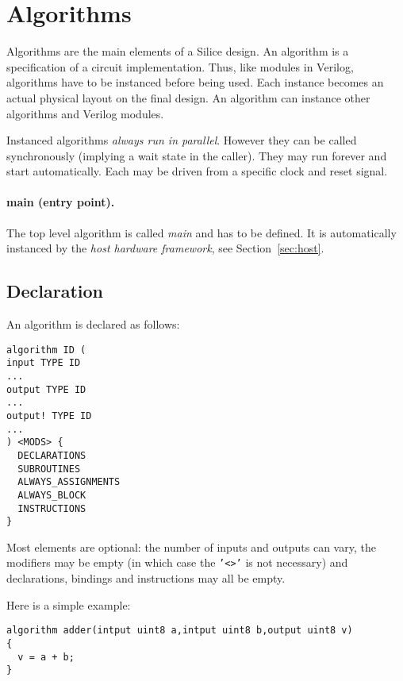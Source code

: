 \documentclass[a4]{article}
\newcommand\verilog{Verilog}
\newcommand\silice{Silice}
\begin{document}

\section{Algorithms}

Algorithms are the main elements of a \silice{} design. An algorithm is a specification of a circuit implementation. Thus, like modules in \verilog{}, algorithms have to be instanced before being used. Each instance becomes an actual physical layout on the final design.
An algorithm can instance other algorithms and \verilog{} modules. 

Instanced algorithms \textit{always run in parallel}. However they can be called synchronously (implying a wait state in the caller). They may run forever and start automatically. Each may be driven from a specific clock and reset signal.

\paragraph{main (entry point).}
The top level algorithm is called \textit{main} and has to be defined. It is automatically instanced by the \textit{host hardware framework}, see Section~\ref{sec:host}.


\subsection{Declaration}

An algorithm is declared as follows:
\begin{verbatim}
algorithm ID (
input TYPE ID
...
output TYPE ID
...
output! TYPE ID
...
) <MODS> {
  DECLARATIONS
  SUBROUTINES
  ALWAYS_ASSIGNMENTS
  ALWAYS_BLOCK
  INSTRUCTIONS
}
\end{verbatim}

Most elements are optional: the number of inputs and outputs can vary, the modifiers may be empty (in which case the \texttt{'<>'} is not necessary) and declarations, bindings and instructions may all be empty.

Here is a simple example:
\begin{verbatim}
algorithm adder(intput uint8 a,intput uint8 b,output uint8 v)
{
  v = a + b;
}
\end{verbatim}
\end{document}
